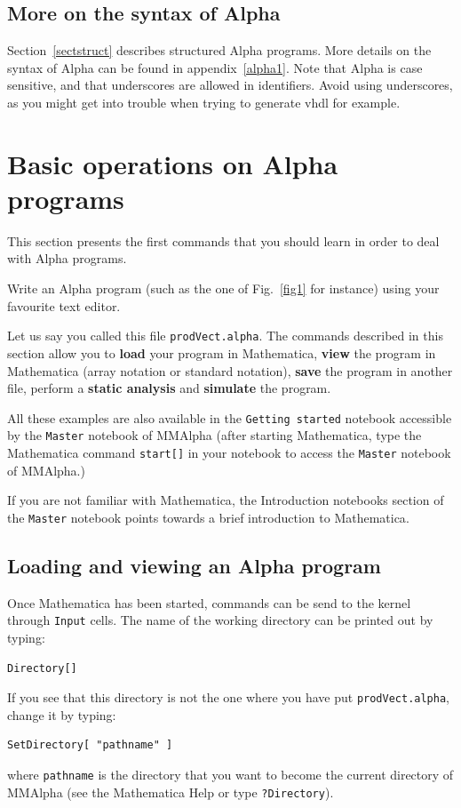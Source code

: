 \documentclass[12pt]{article}
\newcommand{\Alpha}{{\sc Alpha}}
\newcommand{\MMA}{{\sc MMAlpha}}
\newcommand{\vhdl}{{\sc vhdl}}
\newcommand{\alfa}{\Alpha}
\newcommand{\mmalfa}{\MMA}
\newcommand{\mmalpha}{\MMA}
\newcommand{\mma}{{Mathematica}}
\begin{document}
\subsection{More on the syntax of \alfa{}}
Section~\ref{sectstruct} describes structured \alfa{} programs.
More details on the syntax of \alfa{} can be found in
appendix~\ref{alpha1}. 
Note that \alfa{} is case sensitive, and that 
underscores are allowed in identifiers. Avoid using 
underscores, as you might get into trouble when trying to 
generate \vhdl{} for example.

\section{Basic operations on {\Alpha} programs}
\label{basic}

This section presents the first commands that you should learn in
order to deal with {\Alpha} programs. 

Write an {\Alpha}
program (such as the one of Fig.~\ref{fig1} for instance) using your
favourite text editor. 

Let us say you called this file \texttt{prodVect.alpha}.
The commands described in this section allow you to
{\bf load} your program in \mma{}, {\bf view} the program in
\mma{} (array notation or standard notation), {\bf save} the
program in another file, perform a {\bf static analysis} and {\bf simulate}
the program. 

All these examples are also available
in the \texttt{Getting started} notebook accessible by the 
\texttt{Master} notebook of \mmalfa{} (after starting
\mma{}, type the \mma{} command
{\tt start[]} in your notebook to  access the \texttt{Master} notebook of \mmalfa{}.)

If you are not familiar with \mma{}, the 
Introduction 
notebooks section of the
\texttt{Master} notebook
points towards a brief introduction to \mma{}.

\subsection{Loading and viewing an {\Alpha} program}
Once \mma{} has been started, commands can be send to 
the kernel through \texttt{Input} cells. 
The name of the working directory can be printed out
by typing:
\begin{verbatim}
Directory[]
\end{verbatim}

If you see that this directory is not the one where you have put 
{\tt prodVect.alpha}, change it by typing:
\begin{verbatim}
SetDirectory[ "pathname" ]
\end{verbatim}
where \texttt{pathname} is 
the directory that you want to become the current directory of 
\mmalpha{} (see the \mma{} Help or type \texttt{?Directory}).
\end{document}
